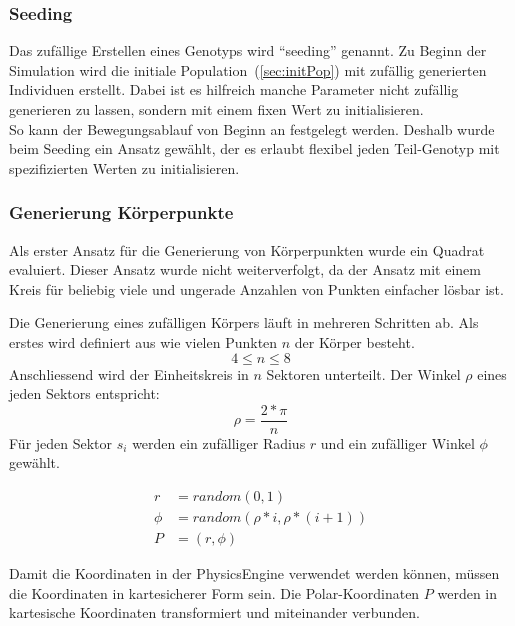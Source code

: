       \subsubsection{Seeding\label{subsub:GenotypeSeeding}}

        Das zufällige Erstellen eines Genotyps wird ``seeding'' genannt.
        Zu Beginn der Simulation wird die initiale Population~(\vref{sec:initPop}) mit zufällig generierten Individuen erstellt.
        Dabei ist es hilfreich manche Parameter nicht zufällig generieren zu lassen,
        sondern mit einem fixen Wert zu initialisieren.
        \\
        So kann der Bewegungsablauf von Beginn an festgelegt werden.
        Deshalb wurde beim Seeding ein Ansatz gewählt, der es erlaubt flexibel jeden Teil-Genotyp mit
        spezifizierten Werten zu initialisieren.

      \subsubsection{Generierung Körperpunkte\label{subsub:GenotypeBodypointCreation}}

        Als erster Ansatz für die Generierung von Körperpunkten wurde ein Quadrat evaluiert.
        Dieser Ansatz wurde nicht weiterverfolgt,
        da der Ansatz mit einem Kreis für beliebig viele und ungerade Anzahlen von Punkten einfacher lösbar ist.

        \medskip

        Die Generierung eines zufälligen Körpers läuft in mehreren Schritten ab.
        Als erstes wird definiert aus wie vielen Punkten \( n \) der Körper besteht.
        \[ 4 \leq n \leq 8 \]
        Anschliessend wird der Einheitskreis in \( n \) Sektoren unterteilt.
        Der Winkel \( \rho \) eines jeden Sektors entspricht:
        \[ \rho = \frac{2 * \pi}{n} \]
        Für jeden Sektor \( s_{i} \) werden ein zufälliger Radius \( r \) und ein zufälliger Winkel \( \phi \) gewählt.

        \begin{align*}
          r &= random(0, 1) \\
          \phi &= random(\rho * i, \rho * (i + 1)) \\
          P &= (r, \phi)
        \end{align*}

        Damit die Koordinaten in der \gls{PhysicsEngine} verwendet werden können,
        müssen die Koordinaten in kartesicherer Form sein.
        Die Polar-Koordinaten \( P \) werden in kartesische Koordinaten transformiert und miteinander verbunden.

